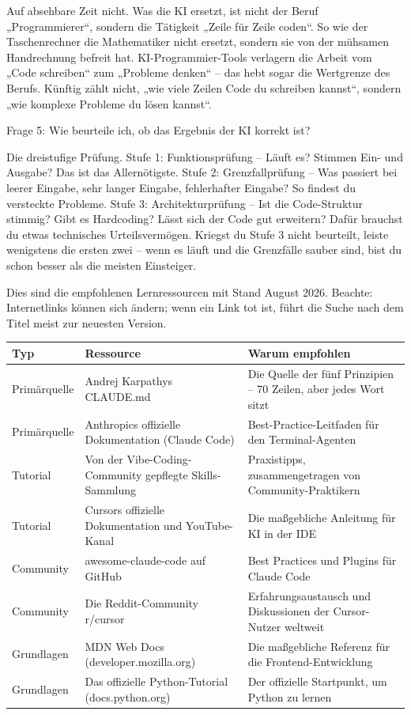 Auf absehbare Zeit nicht. Was die KI ersetzt, ist nicht der Beruf „Programmierer“, sondern die Tätigkeit „Zeile für Zeile coden“. So wie der Taschenrechner die Mathematiker nicht ersetzt, sondern sie von der mühsamen Handrechnung befreit hat. KI-Programmier-Tools verlagern die Arbeit vom „Code schreiben“ zum „Probleme denken“ – das hebt sogar die Wertgrenze des Berufs. Künftig zählt nicht, „wie viele Zeilen Code du schreiben kannst“, sondern „wie komplexe Probleme du lösen kannst“.

Frage 5: Wie beurteile ich, ob das Ergebnis der KI korrekt ist?

Die dreistufige Prüfung. Stufe 1: Funktionsprüfung – Läuft es? Stimmen Ein- und Ausgabe? Das ist das Allernötigste. Stufe 2: Grenzfallprüfung – Was passiert bei leerer Eingabe, sehr langer Eingabe, fehlerhafter Eingabe? So findest du versteckte Probleme. Stufe 3: Architekturprüfung – Ist die Code-Struktur stimmig? Gibt es Hardcoding? Lässt sich der Code gut erweitern? Dafür brauchst du etwas technisches Urteilsvermögen. Kriegst du Stufe 3 nicht beurteilt, leiste wenigstens die ersten zwei – wenn es läuft und die Grenzfälle sauber sind, bist du schon besser als die meisten Einsteiger.


Dies sind die empfohlenen Lernressourcen mit Stand August 2026. Beachte: Internetlinks können sich ändern; wenn ein Link tot ist, führt die Suche nach dem Titel meist zur neuesten Version.

\begin{center}
\begin{tabularx}{\linewidth}{|X|X|X|}
\hline
\textbf{Typ} & \textbf{Ressource} & \textbf{Warum empfohlen} \tabularnewline
\hline
Primärquelle & Andrej Karpathys CLAUDE.md & Die Quelle der fünf Prinzipien – 70 Zeilen, aber jedes Wort sitzt \tabularnewline
Primärquelle & Anthropics offizielle Dokumentation (Claude Code) & Best-Practice-Leitfaden für den Terminal-Agenten \tabularnewline
Tutorial & Von der Vibe-Coding-Community gepflegte Skills-Sammlung & Praxistipps, zusammengetragen von Community-Praktikern \tabularnewline
Tutorial & Cursors offizielle Dokumentation und YouTube-Kanal & Die maßgebliche Anleitung für KI in der IDE \tabularnewline
Community & awesome-claude-code auf GitHub & Best Practices und Plugins für Claude Code \tabularnewline
Community & Die Reddit-Community r/cursor & Erfahrungsaustausch und Diskussionen der Cursor-Nutzer weltweit \tabularnewline
Grundlagen & MDN Web Docs (developer.mozilla.org) & Die maßgebliche Referenz für die Frontend-Entwicklung \tabularnewline
Grundlagen & Das offizielle Python-Tutorial (docs.python.org) & Der offizielle Startpunkt, um Python zu lernen \tabularnewline
\hline
\end{tabularx}
\end{center}

